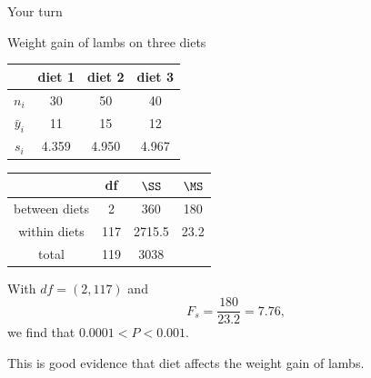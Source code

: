 \begin{frame}{Your turn}

    Weight gain of lambs on three diets
    \begin{center}
        \begin{tabular}{cccc}
            & diet 1 & diet 2 & diet 3 \\
            \hline
            $n_i$ & 30 & 50 & 40 \\
            $\bar y_i$ & 11 & 15 & 12 \\
            $s_i$ & 4.359 & 4.950 & 4.967 \\
        \end{tabular}
    \end{center}

    \pause

    \begin{center}
        \begin{tabular}{cccc}
            & df & $\SS$ & $\MS$ \\
            \hline
            between diets & 2 & 360 & 180 \\
            within diets & 117 & 2715.5 & 23.2 \\
            \hline
            total & 119 & 3038 & \\
        \end{tabular}
    \end{center}


    \vspace{2em}

    With $df = (2,117)$ and
    \[ F_s = \frac{ 180 }{ 23.2 } = 7.76 , \]
    we find that $0.0001 < P < 0.001$.


    \vspace{2em}

    \pause
    This \alert{is} good evidence that diet affects the weight gain of lambs.


\end{frame}


